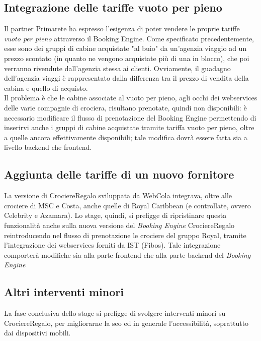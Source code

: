 \subsection{Integrazione delle tariffe vuoto per pieno}
Il partner Primarete ha espresso l'esigenza di poter vendere le proprie tariffe \textit{vuoto per pieno} attraverso il Booking Engine. Come specificato precedentemente, esse sono dei gruppi di cabine acquistate "al buio" da un'agenzia viaggio ad un prezzo scontato (in quanto ne vengono acquistate più di una in blocco), che poi verranno rivendute dall'agenzia stessa ai clienti. Ovviamente, il guadagno dell'agenzia viaggi è rappresentato dalla differenza tra il prezzo di vendita della cabina e quello di acquisto.\\
Il problema è che le cabine associate al vuoto per pieno, agli occhi dei \glspl{webservice} delle varie compagnie di crociera, risultano prenotate, quindi non disponibili: è necessario modificare il flusso di prenotazione del Booking Engine permettendo di inserirvi anche i gruppi di cabine acquistate tramite tariffa vuoto per pieno, oltre a quelle ancora effettivamente disponibili; tale modifica dovrà essere fatta sia a livello backend che frontend.

\subsection{Aggiunta delle tariffe di un nuovo fornitore}
La versione di CrociereRegalo sviluppata da WebCola integrava, oltre alle crociere di MSC e Costa, anche quelle di Royal Caribbean (e controllate, ovvero Celebrity e Azamara). Lo stage, quindi, si prefigge di ripristinare questa funzionalità anche sulla nuova versione del \textit{Booking Engine} CrociereRegalo reintroducendo nel flusso di prenotazione le crociere del gruppo Royal, tramite l'integrazione dei \glspl{webservice} forniti da IST (Fibos). Tale integrazione comporterà modifiche sia alla parte frontend che alla parte backend del \textit{Booking Engine}


\subsection{Altri interventi minori}
La fase conclusiva dello stage si prefigge di svolgere interventi minori su CrociereRegalo, per migliorarne la \gls{seo} ed in generale l'accessibilità, soprattutto dai dispositivi mobili.

